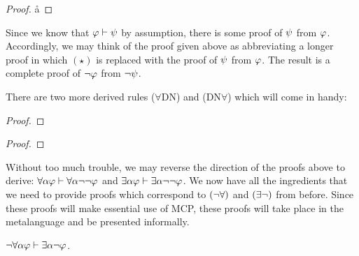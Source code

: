 \begin{proof}
	     \pr{}
    \open
            
            
       \r{a}
    \close
       
\end{proof}

Since we know that $\varphi \vdash \psi$ by assumption, there is some proof of $\psi$ from $\varphi$.
Accordingly, we may think of the proof given above as abbreviating a longer proof in which $(\star)$ is replaced with the proof of $\psi$ from $\varphi$.
The result is a complete proof of $\neg\varphi$ from $\neg\psi$. 

There are two more derived rules ($\forall$DN) and (DN$\forall$) which will come in handy:

\begin{multicols}{2}
  
\begin{proof}
	   \pr{}
    
              
                
\end{proof}

\begin{proof}
	   \pr{}
    \open
        \as{}
                  
                   
    \close
               
\end{proof}

\end{multicols}

Without too much trouble, we may reverse the direction of the proofs above to derive: $\forall \alpha\varphi \vdash \forall \alpha \neg\neg \varphi$ and $\exists \alpha \varphi \vdash \exists \alpha \neg\neg \varphi$. 
We now have all the ingredients that we need to provide proofs which correspond to $(\neg\forall)$ and $(\exists\neg)$ from before.
Since these proofs will make essential use of MCP, these proofs will take place in the metalanguage and be presented informally.

\begin{Lthm}[$\enot\forall$] \label{lemma:NotForAll}
    $\neg\forall \alpha\varphi \vdash \exists \alpha\neg\varphi$.
\end{Lthm}

